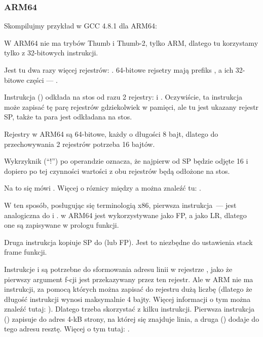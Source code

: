 \subsubsection{ARM64}


Skompilujmy przykład w GCC 4.8.1 dla ARM64:



W ARM64 nie ma trybów Thumb i Thumb-2, tylko ARM, dlatego tu korzystamy tylko z 32-bitowych instrukcji.

Jest tu dwa razy więcej rejestrów: .
64-bitowe rejsetry mają prefiks 
, a ich 32-bitowe części --- .

Instrukcja  () 
odkłada na stos od razu 2 rejestry:  i .
Oczywiście, ta instrukcja może zapisać tę parę rejestrów gdziekolwiek w pamięci, ale tu jest ukazany rejestr \ac{SP}, także ta para jest odkładana na stos.

Rejestry w ARM64 są 64-bitowe, każdy o długości 8 bajt, dlatego do przechowywania 2 rejestrów potrzeba 16 bajtów.

Wykrzyknik (``!'') po operandzie oznacza, że najpierw od \ac{SP} będzie odjęte 16 i dopiero po tej czynności wartości z obu rejestrów będą odłożone na stos.

Na to się mówi .
Więcej o róznicy między  a  
można znaleźć tu: .

W ten sposób, posługując się terminologią x86, pierwsza instrukcja~--- jest analogiczna do  i .
 w ARM64 jest wykorzystywane jako \ac{FP}, a  
jako \ac{LR}, dlatego one są zapisywane w prologu funkcji.

Druga instrukcja kopiuje \ac{SP} do  (lub \ac{FP}).
Jest to niezbędne do ustawienia stack frame funkcji.

\label{pointers_ADRP_and_ADD}
Instrukcje  i \ADD są potrzebne do sformowania adresu linii  w rejestrze , 
jako że pierwszy argument f-cji jest przekazywany przez ten rejestr.
Ale w ARM nie ma instrukcji, za pomocą których można zapisać do rejestru dużą liczbę 
(dlatego że długość instrukcji wynosi maksymalnie 4 bajty. Więcej informacji o tym można znaleźć tutaj: ).
Dlatego trzeba skorzystać z kilku instrukcji.
Pierwsza instrukcja () zapisuje do  adres 4-kB strony, na której się znajduje linia, 
a druga (\ADD) dodaje do tego adresu resztę.
Więcej o tym tutaj: .

